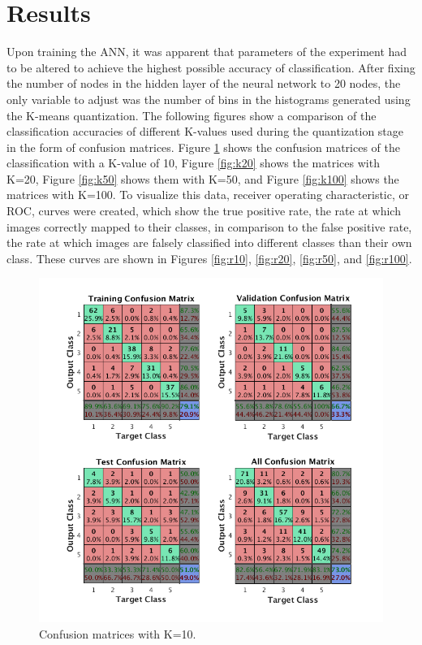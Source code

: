 \documentclass{article}
\begin{document}
\section{Results}
\label{sec:results}
Upon training the ANN, it was apparent that parameters of the experiment had to be altered to achieve the highest possible accuracy of classification. After fixing the number of nodes in the hidden layer of the neural network to 20 nodes, the only variable to adjust was the number of bins in the histograms generated using the K-means quantization. The following figures show a comparison of the classification accuracies of different K-values used during the quantization stage in the form of confusion matrices. Figure \ref{fig:k10} shows the confusion matrices of the classification with a K-value of 10, Figure \ref{fig:k20} shows the matrices with K=20, Figure \ref{fig:k50} shows them with K=50, and Figure \ref{fig:k100} shows the matrices with K=100. To visualize this data, receiver operating characteristic, or ROC, curves were created, which show the true positive rate, the rate at which images correctly mapped to their classes, in comparison to the false positive rate, the rate at which images are falsely classified into different classes than their own class. These curves are shown in Figures \ref{fig:r10}, \ref{fig:r20}, \ref{fig:r50}, and \ref{fig:r100}.
%
\begin{figure}[Ht]
\centering
\includegraphics[scale=0.5]{Figures/Metrics/conf_k10}
\caption{Confusion matrices with K=10.}
\label{fig:k10}
\end{figure}
\end{document}
